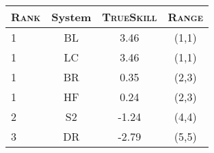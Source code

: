 \begin{tabular}{l|ccc} 
\hline
\textsc{Rank} & System & \textsc{TrueSkill} & \textsc{Range}\\
\hline 
1 & \textsc{BL} & 3.46   & (1,1)  \\
1 & \textsc{LC} & 3.46   & (1,1)  \\
1 & \textsc{BR} & 0.35   & (2,3)  \\
1 & \textsc{HF} & 0.24   & (2,3) \\
2 & \textsc{S2} & -1.24  & (4,4) \\
3 & \textsc{DR} & -2.79  & (5,5) \\
\end{tabular}
